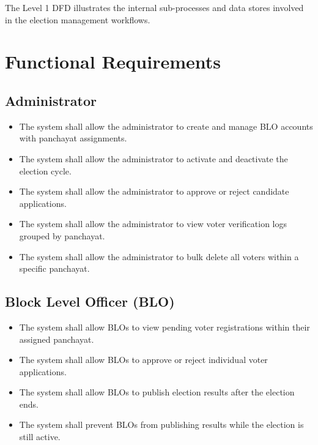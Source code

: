 The Level 1 DFD illustrates the internal sub-processes and data stores involved in the election management workflows.

\section{Functional Requirements}

\subsection{Administrator}
\begin{itemize}
    \item The system shall allow the administrator to create and manage BLO accounts with panchayat assignments.
    \item The system shall allow the administrator to activate and deactivate the election cycle.
    \item The system shall allow the administrator to approve or reject candidate applications.
    \item The system shall allow the administrator to view voter verification logs grouped by panchayat.
    \item The system shall allow the administrator to bulk delete all voters within a specific panchayat.
\end{itemize}

\subsection{Block Level Officer (BLO)}
\begin{itemize}
    \item The system shall allow BLOs to view pending voter registrations within their assigned panchayat.
    \item The system shall allow BLOs to approve or reject individual voter applications.
    \item The system shall allow BLOs to publish election results after the election ends.
    \item The system shall prevent BLOs from publishing results while the election is still active.
\end{itemize}

